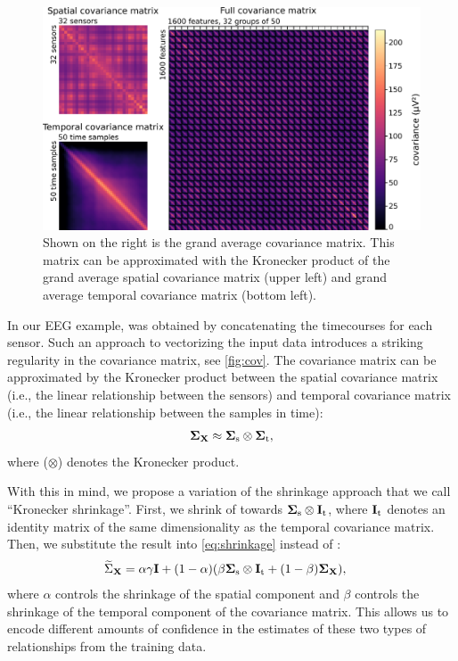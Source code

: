 \documentclass[a4paper]{vanvliet_paper}
\newcommand{\modcov}{\widetilde{\Sigma}_{\mat{X}}}
\begin{document}
\begin{figure}
    \includegraphics[width=\textwidth]{figures/cov.pdf}
    \caption{Shown on the right is the grand average covariance matrix. This matrix can be approximated with the Kronecker product of the grand average spatial covariance matrix (upper left) and grand average temporal covariance matrix (bottom left).}\label{fig:cov}
\end{figure}

In our \gls{EEG} example,  was obtained by concatenating the timecourses for each sensor.
Such an approach to vectorizing the input data introduces a striking regularity in the covariance matrix, see \autoref{fig:cov}.
The covariance matrix can be approximated by the Kronecker product\cite{Loan2000} between the spatial covariance matrix  (i.e., the linear relationship between the sensors) and temporal covariance matrix  (i.e., the linear relationship between the samples in time):\cite{Bijma2005}
\begin{align}
    \mathbf{\Sigma}_{\mathbf{\mathbf{X}}} \approx \mathbf{\Sigma}_{\mathbf{\text{s}}} \otimes \mathbf{\Sigma}_{\mathbf{\text{t}}},
\end{align}
where ($\otimes$) denotes the Kronecker product.

With this in mind, we propose a variation of the shrinkage approach that we call ``Kronecker shrinkage''.
First, we shrink of  towards $\mathbf{\Sigma}_{\mathbf{\text{s}}} \otimes \mathbf{I}_\text{t}$, where $\mathbf{I}_\text{t}$ denotes an identity matrix of the same dimensionality as the temporal covariance matrix.
Then, we substitute the result into \autoref{eq:shrinkage} instead of :
\begin{align}\label{eq:kronecker}
    \modcov &= \alpha \gamma \mat{I} + (1 - \alpha) (\beta \cov{\text{s}} \otimes \mat{I}_\text{t} + (1 - \beta) \cov{\mat{X}}),
\end{align}
where $\alpha$ controls the shrinkage of the spatial component and $\beta$ controls the shrinkage of the temporal component of the covariance matrix.
This allows us to encode different amounts of confidence in the estimates of these two types of relationships from the training data.
\end{document}
